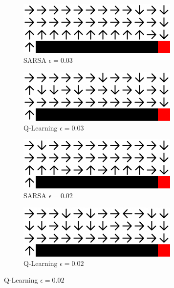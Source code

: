 \documentclass{article}
\begin{document}
\begin{figure}
    \begin{subfigure}{.5\textwidth}
        \centering
        \includegraphics[width=.8\linewidth]{imgs/sarsa_epsilon_0.03.png}
        \caption{SARSA $\epsilon=0.03$}
    \end{subfigure}
    \begin{subfigure}{.5\textwidth}
        \centering
        \includegraphics[width=.8\linewidth]{imgs/qlearning_epsilon_0.03.png}
        \caption{Q-Learning $\epsilon=0.03$}
    \end{subfigure}

    \begin{subfigure}{.5\textwidth}
        \centering
        \includegraphics[width=.8\linewidth]{imgs/sarsa_epsilon_0.02.png}
        \caption{SARSA $\epsilon=0.02$}
    \end{subfigure}
    \begin{subfigure}{.5\textwidth}
        \centering
        \includegraphics[width=.8\linewidth]{imgs/qlearning_epsilon_0.02.png}
        \caption{Q-Learning $\epsilon=0.02$}
    \end{subfigure}


\end{figure}
\end{document}
